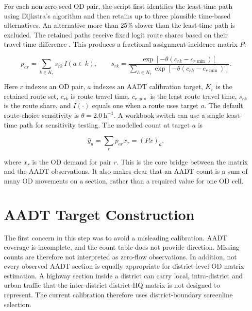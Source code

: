 \documentclass[11pt,a4paper]{article}
\begin{document}
For each non-zero seed OD pair, the script first identifies the least-time path
using Dijkstra's algorithm and then retains up to three plausible time-based
alternatives. An alternative more than 25\% slower than the least-time path is
excluded. The retained paths receive fixed logit route shares based on their
travel-time difference \cite{ortuzar2011}. This produces a fractional
assignment-incidence matrix $P$:

\begin{equation}
p_{ar}=\sum_{k\in K_r}s_{rk}\,I(a\in k),
\qquad
s_{rk}=
\frac{\exp[-\theta(c_{rk}-c_{r\min})]}
{\sum_{h\in K_r}\exp[-\theta(c_{rh}-c_{r\min})]}.
\label{eq:incidence}
\end{equation}

Here $r$ indexes an OD pair, $a$ indexes an AADT calibration target, $K_r$ is
the retained route set, $c_{rk}$ is route travel time, $c_{r\min}$ is the
least route travel time, $s_{rk}$ is the route share, and $I(\cdot)$ equals one
when a route uses target $a$. The default route-choice sensitivity is
$\theta=2.0~\mathrm{h}^{-1}$. A workbook switch can use a single least-time
path for sensitivity testing. The modelled count at target $a$ is

\begin{equation}
\hat{y}_a = \sum_r p_{ar}x_r = (Px)_a,
\label{eq:count_equation}
\end{equation}

where $x_r$ is the OD demand for pair $r$. This is the core bridge between the
matrix and the AADT observations. It also makes clear that an AADT count is a
sum of many OD movements on a section, rather than a required value for one OD
cell.

\section{AADT Target Construction}

The first concern in this step was to avoid a misleading calibration. AADT
coverage is incomplete, and the count table does not provide direction. Missing
counts are therefore not interpreted as zero-flow observations. In addition,
not every observed AADT section is equally appropriate for district-level OD
matrix estimation. A highway section inside a district can carry local,
intra-district and urban traffic that the inter-district district-HQ matrix is
not designed to represent. The current calibration therefore uses
district-boundary screenline selection.
\end{document}
